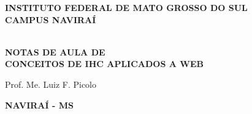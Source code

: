 \thispagestyle{empty}

\vfill
 \begin{center}
    
    {\large\bfseries INSTITUTO FEDERAL DE MATO GROSSO DO SUL} \\
    
    {\large\bfseries CAMPUS NAVIRAÍ}  \\ 

    \vspace*{1in}

    \vspace*{4cm}
    \noindent \\
    
    \large\bfseries{NOTAS DE AULA DE} \\
    \huge\bfseries{CONCEITOS DE IHC APLICADOS A WEB} \\
    
    \vspace*{4cm}
    
    \large{Prof. Me. Luiz F. Picolo}
    
    \vfill
    \large\bfseries{ NAVIRAÍ - MS}
\end{center}

\normalsize


